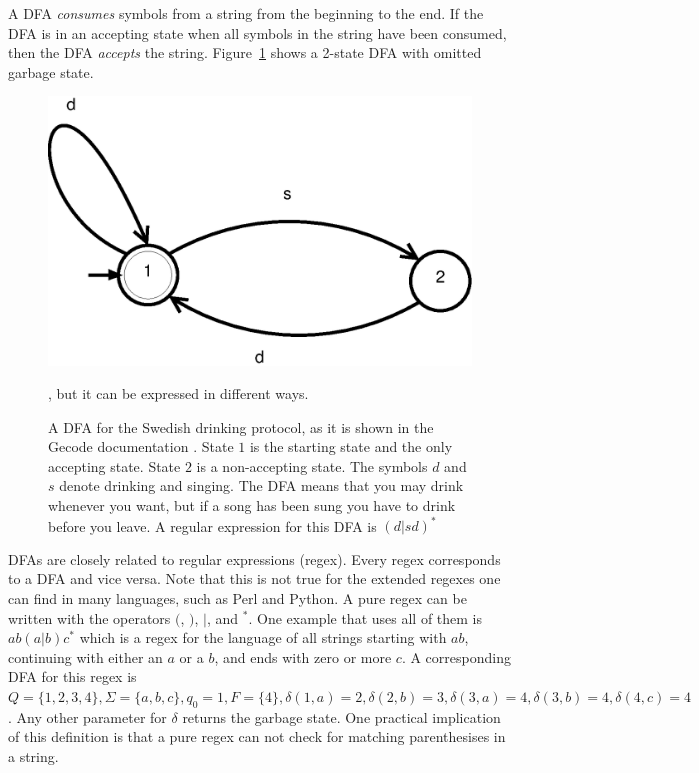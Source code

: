 \documentclass[a4paper,11pt]{article}
\begin{document}
A DFA \textit{consumes} symbols from a string from the beginning to the end. If the DFA is in an accepting state when all symbols in the string have been consumed, then the DFA \textit{accepts} the string. Figure~\ref{fig:dfasdp} shows a 2-state DFA with omitted garbage state.

\begin{figure}[H]
\centering
\includegraphics[scale=0.6]{dfa.eps}
\caption{A DFA for the Swedish drinking protocol, as it is shown in the Gecode documentation \cite{mpg}. State $1$ is the starting state and the only accepting state. State $2$ is a non-accepting state. The symbols $d$ and $s$ denote drinking and singing. The DFA means that you may drink whenever you want, but if a song has been sung you have to drink before you leave. A regular expression for this DFA is $(d|sd)^{*}$}, but it can be expressed in different ways.
\label{fig:dfasdp}
\end{figure}


DFAs are closely related to regular expressions (regex). Every regex corresponds to a DFA and vice versa. Note that this is not true for the extended regexes one can find in many languages, such as Perl and Python. A pure regex can be written with the operators $($, $)$, $|$, and $^{*}$. One example that uses all of them is $ab(a|b)c^{*}$ which is a regex for the language of all strings starting with $ab$, continuing with either an $a$ or a $b$, and ends with zero or more $c$. A corresponding DFA for this regex is $Q=\{1,2,3,4\}, \Sigma=\{a,b,c\}, q_0=1, F=\{4\}, \delta(1,a)=2, \delta(2,b)=3, \delta(3,a)=4, \delta(3,b)=4, \delta(4,c)=4$. Any other parameter for $\delta$ returns the garbage state. One practical implication of this definition is that a pure regex can not check for matching parenthesises in a string.
\end{document}
